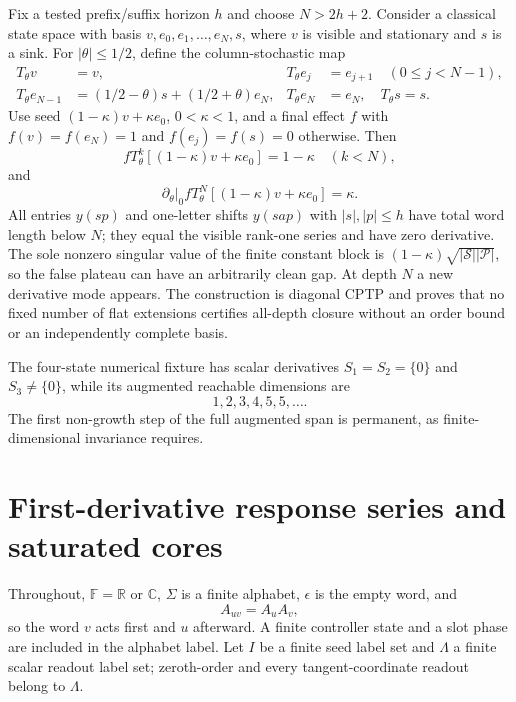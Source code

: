 \documentclass[aps,prl,onecolumn,superscriptaddress,nofootinbib]{revtex4-2}
\newcommand{\R}{\mathbb R}
\newcommand{\C}{\mathbb C}
\newcommand{\F}{\mathbb F}
\newcommand{\cP}{\mathcal P}
\newcommand{\cS}{\mathcal S}
\begin{document}
Fix a tested prefix/suffix horizon $h$ and choose $N>2h+2$.  Consider a classical state space with basis $v,e_0,e_1,\ldots,e_N,s$, where $v$ is visible and stationary and $s$ is a sink.  For $|\theta|\le1/2$, define the column-stochastic map
\begin{align}
 T_\theta v&=v,&
 T_\theta e_j&=e_{j+1}\quad(0\le j<N-1),\nonumber\\
 T_\theta e_{N-1}&=(1/2-\theta)s+(1/2+\theta)e_N,&
 T_\theta e_N&=e_N,
 \quad T_\theta s=s.
 \label{eq:delayed-map}
\end{align}
Use seed $(1-\kappa)v+\kappa e_0$, $0<\kappa<1$, and a final effect $f$ with $f(v)=f(e_N)=1$ and $f(e_j)=f(s)=0$ otherwise.  Then
\begin{equation}
 fT_\theta^k[(1-\kappa)v+\kappa e_0]=1-\kappa\quad(k<N),
 \label{eq:delayed-flat}
\end{equation}
and
\begin{equation}
 \left.\partial_\theta\right|_0
 fT_\theta^N[(1-\kappa)v+\kappa e_0]=\kappa.
 \label{eq:delayed-growth}
\end{equation}
All entries $y(sp)$ and one-letter shifts $y(sap)$ with $|s|,|p|\le h$ have total word length below $N$; they equal the visible rank-one series and have zero derivative.  The sole nonzero singular value of the finite constant block is $(1-\kappa)\sqrt{|\cS||\cP|}$, so the false plateau can have an arbitrarily clean gap.  At depth $N$ a new derivative mode appears.  The construction is diagonal CPTP and proves that no fixed number of flat extensions certifies all-depth closure without an order bound or an independently complete basis.

The four-state numerical fixture has scalar derivatives $S_1=S_2=\{0\}$ and $S_3\ne\{0\}$, while its augmented reachable dimensions are
\begin{equation}
 1,2,3,4,5,5,\ldots .
 \label{eq:jet-dims-validation}
\end{equation}
The first non-growth step of the full augmented span is permanent, as finite-dimensional invariance requires.

\section{First-derivative response series and saturated cores}
\label{sec:definitions}

Throughout, $\F=\R$ or $\C$, $\Sigma$ is a finite alphabet, $\epsilon$ is the empty word, and
\begin{equation}
 A_{uv}=A_uA_v,
 \label{eq:word-convention}
\end{equation}
so the word $v$ acts first and $u$ afterward.  A finite controller state and a slot phase are included in the alphabet label.  Let $I$ be a finite seed label set and $\Lambda$ a finite scalar readout label set; zeroth-order and every tangent-coordinate readout belong to $\Lambda$.
\end{document}
